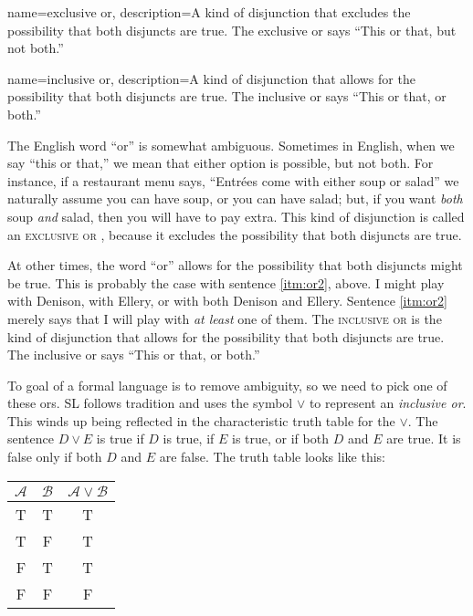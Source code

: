 {
name=exclusive or,
description={A kind of disjunction that excludes the possibility that both disjuncts are true. The exclusive or says ``This or that, but not both.''}
}

{
name=inclusive or,
description={A kind of disjunction that allows for the possibility that both disjuncts are true. The inclusive or says ``This or that, or both.''}
}

The English word ``or'' is somewhat ambiguous. Sometimes in English, when we say ``this or that,'' we mean that either option is possible, but not both. For instance, if a restaurant menu says, ``Entr\'ees come with either soup or salad'' we naturally assume you can have soup, or you can have salad; but, if you want \emph{both} soup \emph{and} salad, then you will have to pay extra. This kind of disjunction is called an \textsc{\gls{exclusive or}} \label{def:exclusive_or}, because it excludes the possibility that both disjuncts are true.

At other times, the word ``or'' allows for the possibility that both disjuncts might be true. This is probably the case with sentence \ref{itm:or2}, above. I might play with Denison, with Ellery, or with both Denison and Ellery. Sentence \ref{itm:or2} merely says that I will play with \emph{at least} one of them. The \textsc{\gls{inclusive or}}\label{def:inclusive _or} is the kind of disjunction that allows for the possibility that both disjuncts are true. The inclusive or says ``This or that, or both.''

To goal of a formal language is to remove ambiguity, so we need to pick one of these ors. SL follows tradition and uses the symbol $\lor$ to represent an \emph{inclusive or}. This winds up being reflected in the characteristic truth table for the $\lor$. The sentence $D \lor E$ is true if $D$ is true, if $E$ is true, or if both $D$ and $E$ are true. It is false only if both $D$ and $E$ are false. The truth table looks like this:

\begin{center}
\begin{tabular}{c|c|c}
$\mathcal{A}$ & $\mathcal{B}$ & $\mathcal{A} \lor \mathcal{B}$ \\
\hline
T & T & T\\
T & F & T\\
F & T & T\\
F & F & F
\end{tabular}
\end{center}

